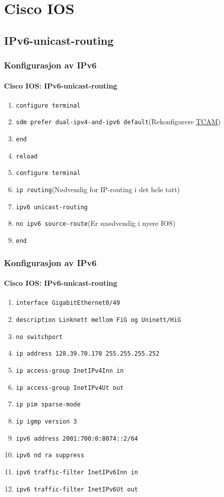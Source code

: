 \section{Cisco IOS}
\subsection{IPv6-unicast-routing}
\begin{frame}%
  \frametitle{Konfigurasjon av IPv6}
  \framesubtitle{Cisco IOS: IPv6-unicast-routing}
  \pause
  \begin{enumerate}[<+->]
  \item \texttt{configure terminal}
  \item \alert{\texttt{sdm prefer dual-ipv4-and-ipv6 default}}\hfill(Rekonfigurere \href{http://en.wikipedia.org/wiki/Content-addressable_memory}{TCAM})
  \item \texttt{end}
  \item \texttt{reload}
  \item \texttt{configure terminal}
  \item \alert{\texttt{ip routing}}\hfill(Nødvendig for IP-routing i det hele tatt)
  \item \alert{\texttt{ipv6 unicast-routing}}
  \item \texttt{no ipv6 source-route}\hfill(Er unødvendig i nyere IOS)
  \item \texttt{end}
  \end{enumerate}
\end{frame}

\begin{frame}%
  \frametitle{Konfigurasjon av IPv6}
  \framesubtitle{Cisco IOS: IPv6-unicast-routing}
  \begin{enumerate}[<+->]
  \item \alert{\texttt{interface GigabitEthernet0/49}}
  \item \texttt{description Linknett mellom FiG og Uninett/HiG}
  \item \alert{\texttt{no switchport}}
  \item \texttt{ip address 128.39.70.170 255.255.255.252}
  \item \texttt{ip access-group InetIPv4Inn in}
  \item \texttt{ip access-group InetIPv4Ut out}
  \item \texttt{ip pim sparse-mode}
  \item \texttt{ip igmp version 3}
  \item \alert{\texttt{ipv6 address 2001:700:0:8074::2/64}}
  \item \alert{\texttt{ipv6 nd ra suppress}}
  \item \alert{\texttt{ipv6 traffic-filter InetIPv6Inn in}}
  \item \alert{\texttt{ipv6 traffic-filter InetIPv6Ut out}}
  \end{enumerate}
\end{frame}

